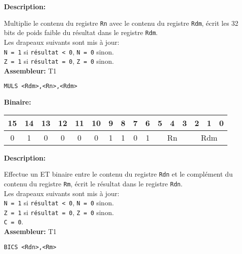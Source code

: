 \documentclass{article}
\begin{document}

    \textbf{Description: }

    Multiplie le contenu du registre \texttt{Rn} avec le contenu du registre \texttt{Rdm}, écrit les 32 bits de poids faible du résultat dans le registre \texttt{Rdm}.\\
    Les drapeaux suivants sont mis à jour:\\
    \texttt{N = 1} si \texttt{résultat < 0}, \texttt{N = 0} sinon.\\
    \texttt{Z = 1} si \texttt{résultat = 0}, \texttt{Z = 0} sinon.\\

    \textbf{Assembleur:} T1

    \begin{lstlisting}
MULS <Rdm>,<Rn>,<Rdm>
    \end{lstlisting}

    \textbf{Binaire:}\\

    \begin{tabular}{| c c c c c c c c c c c c c c c c |}
        \hline
        15 & 14 & 13 & 12 & 11 & 10 & \multicolumn{1}{|c}{9} & 8 & 7 & 6 & \multicolumn{1}{|c}{5} & 4 & 3 & \multicolumn{1}{|c}{2} & 1 & 0 \\
        \hline
        0 & 1 & 0 & 0 & 0 & 0 & \multicolumn{1}{|c}{1} & 1 & 0 & 1 & \multicolumn{3}{|c}{Rn} & \multicolumn{3}{|c|}{Rdm} \\
        \hline
    \end{tabular}



    \textbf{Description: }

    Effectue un ET binaire entre le contenu du registre \texttt{Rdn} et le complément du contenu du registre \texttt{Rm}, écrit le résultat dans le registre \texttt{Rdn}.\\
    Les drapeaux suivants sont mis à jour:\\
    \texttt{N = 1} si \texttt{résultat < 0}, \texttt{N = 0} sinon.\\
    \texttt{Z = 1} si \texttt{résultat = 0}, \texttt{Z = 0} sinon.\\
    \texttt{C = 0}.\\

    \textbf{Assembleur:} T1

    \begin{lstlisting}
BICS <Rdn>,<Rm>
    \end{lstlisting}
\end{document}
